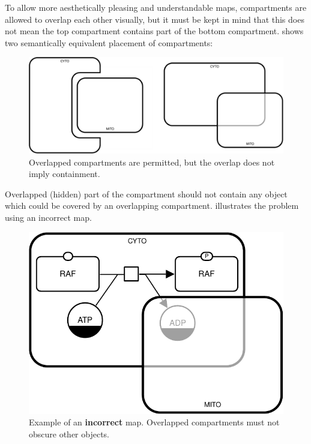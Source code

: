 To allow more aesthetically pleasing and understandable maps, compartments are allowed to overlap each other visually, but it must be kept in mind that this does not mean the top compartment contains part of the bottom compartment.
 shows two semantically equivalent placement of compartments:

\begin{figure}[H]
  \centering
  \includegraphics[scale = 0.5]{images/build/compartment_overlapping_example.pdf}
  \caption{Overlapped compartments are permitted, but the overlap does not imply containment.}
  \label{fig:overlap}
\end{figure}

Overlapped (hidden) part of the compartment should not contain any object which could be covered by an overlapping compartment.
 illustrates the problem using an incorrect map.

\begin{figure}[H]
  \centering
  \includegraphics[scale = 0.8]{images/build/compartment_overlapping_wrong_example.pdf}
  \caption{Example of an \textbf{incorrect} map.  Overlapped compartments must not obscure other objects.}
  \label{fig:overlap-bad}
\end{figure}

